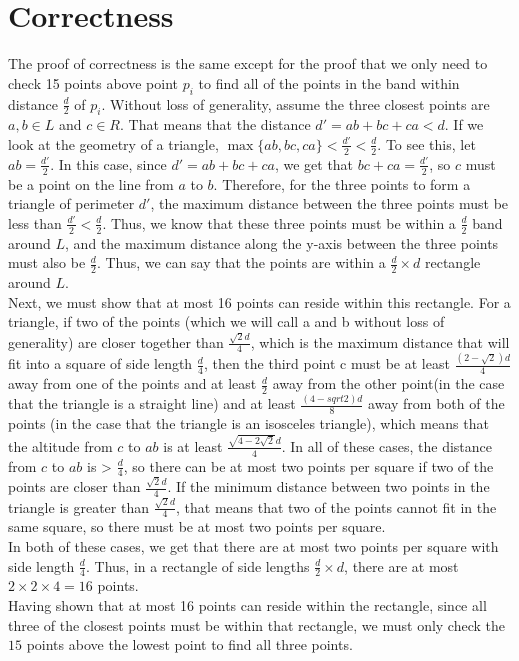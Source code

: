 \documentclass[12pt]{article}
\begin{document}
\section*{Correctness}
The proof of correctness is the same except for the proof that we only need to check 15 points above point $p_i$ to find all of the points in the band within distance $\frac{d}{2}$ of $p_i$. Without loss of generality, assume the three closest points are $a, b \in L$ and $c \in R$. That means that the distance $d' = ab + bc + ca < d$. If we look at the geometry of a triangle, $\max\{ab, bc, ca\} < \frac{d'}{2} < \frac{d}{2}$. To see this, let $ab = \frac{d'}{2}$. In this case, since $d' = ab + bc + ca$, we get that $bc + ca = \frac{d'}{2}$, so $c$ must be a point on the line from $a$ to $b$. Therefore, for the three points to form a triangle of perimeter $d'$, the maximum distance between the three points must be less than $\frac{d'}{2} < \frac{d}{2}$. Thus, we know that these three points must be within a $\frac{d}{2}$ band around $L$, and the maximum distance along the y-axis between the three points must also be $\frac{d}{2}$. Thus, we can say that the points are within a $\frac{d}{2} \times d$ rectangle around $L$. \\
Next, we must show that at most 16 points can reside within this rectangle. For a triangle, if two of the points (which we will call a and b without loss of generality) are closer together than $\frac{\sqrt{2}d}{4}$, which is the maximum distance that will fit into a square of side length $\frac{d}{4}$, then the third point c must be at least $\frac{(2 - \sqrt{2})d}{4}$ away from one of the points and at least $\frac{d}{2}$ away from the other point(in the case that the triangle is a straight line) and at least $\frac{(4 - sqrt{2})d}{8}$ away from both of the points (in the case that the triangle is an isosceles triangle), which means that the altitude from $c$ to $ab$ is at least $\frac{\sqrt{4 - 2\sqrt{2}}d}{4}$. In all of these cases, the distance from $c$ to $ab$ is > $\frac{d}{4}$, so there can be at most two points per square if two of the points are closer than $\frac{\sqrt{2}d}{4}$. If the minimum distance between two points in the triangle is greater than $\frac{\sqrt{2}d}{4}$, that means that two of the points cannot fit in the same square, so there must be at most two points per square. \\
In both of these cases, we get that there are at most two points per square with side length $\frac{d}{4}$. Thus, in a rectangle of side lengths $\frac{d}{2} \times d$, there are at most $2 \times 2 \times 4 = 16$ points. \\
Having shown that at most 16 points can reside within the rectangle, since all three of the closest points must be within that rectangle, we must only check the $15$ points above the lowest point to find all three points. 
\end{document}
